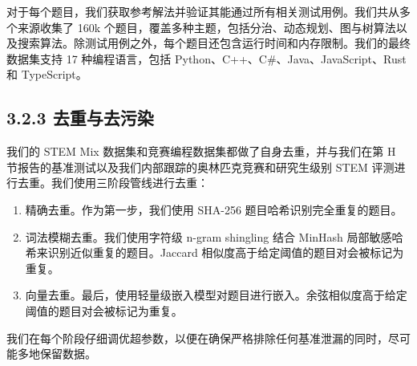 对于每个题目，我们获取参考解法并验证其能通过所有相关测试用例。我们共从多个来源收集了 160k 个题目，覆盖多种主题，包括分治、动态规划、图与树算法以及搜索算法。除测试用例之外，每个题目还包含运行时间和内存限制。我们的最终数据集支持 17 种编程语言，包括 Python、C++、C\#、Java、JavaScript、Rust 和 TypeScript。

\subsection{3.2.3 去重与去污染}\label{deduplication-and-decontamination}

我们的 STEM Mix 数据集和竞赛编程数据集都做了自身去重，并与我们在第 H 节报告的基准测试以及我们内部跟踪的奥林匹克竞赛和研究生级别 STEM 评测进行去重。我们使用三阶段管线进行去重：

\begin{enumerate}
\def\labelenumi{\arabic{enumi}.}
\item
  精确去重。作为第一步，我们使用 SHA-256 题目哈希识别完全重复的题目。
\item
  词法模糊去重。我们使用字符级 n-gram shingling 结合 MinHash 局部敏感哈希来识别近似重复的题目。Jaccard 相似度高于给定阈值的题目对会被标记为重复。
\item
  向量去重。最后，使用轻量级嵌入模型对题目进行嵌入。余弦相似度高于给定阈值的题目对会被标记为重复。
\end{enumerate}

我们在每个阶段仔细调优超参数，以便在确保严格排除任何基准泄漏的同时，尽可能多地保留数据。
